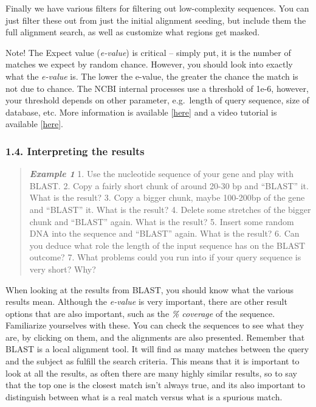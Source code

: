\documentclass[]{article}
\begin{document}
Finally we have various filters for filtering out low-complexity
sequences. You can just filter these out from just the initial alignment
seeding, but include them the full alignment search, as well as
customize what regions get masked.

Note! The Expect value (\emph{e-value}) is critical -- simply put, it is
the number of matches we expect by random chance. However, you should
look into exactly what the \emph{e-value} is. The lower the e-value, the
greater the chance the match is not due to chance. The NCBI internal
processes use a threshold of 1e-6, however, your threshold depends on
other parameter, e.g.~length of query sequence, size of database, etc.
More information is available
{[}\href{http://www.ncbi.nlm.nih.gov/BLAST/blastcgihelp.shtml\#expect}{here}{]}
and a video tutorial is available
{[}\href{https://www.youtube.com/watch?v=nO0wJgZRZJs}{here}{]}.

\subsubsection{1.4. Interpreting the
results}\label{interpreting-the-results}

\begin{quote}
\emph{\textbf{Example 1}} 1. Use the nucleotide sequence of your gene
and play with BLAST. 2. Copy a fairly short chunk of around 20-30 bp and
``BLAST'' it. What is the result? 3. Copy a bigger chunk, maybe
100-200bp of the gene and ``BLAST'' it. What is the result? 4. Delete
some stretches of the bigger chunk and ``BLAST'' again. What is the
result? 5. Insert some random DNA into the sequence and ``BLAST'' again.
What is the result? 6. Can you deduce what role the length of the input
sequence has on the BLAST outcome? 7. What problems could you run into
if your query sequence is very short? Why?
\end{quote}

When looking at the results from BLAST, you should know what the various
results mean. Although the \emph{e-value} is very important, there are
other result options that are also important, such as the \emph{\%
coverage} of the sequence. Familiarize yourselves with these. You can
check the sequences to see what they are, by clicking on them, and the
alignments are also presented. Remember that BLAST is a local alignment
tool. It will find as many matches between the query and the subject as
fulfill the search criteria. This means that it is important to look at
all the results, as often there are many highly similar results, so to
say that the top one is the closest match isn't always true, and its
also important to distinguish between what is a real match versus what
is a spurious match.
\end{document}

